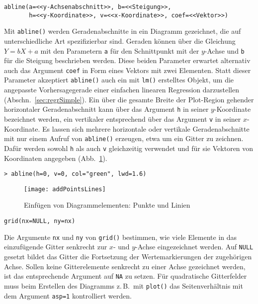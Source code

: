 \begin{lstlisting}
abline(a=<<y-Achsenabschnitt>>, b=<<Steigung>>,
       h=<<y-Koordinate>>, v=<<x-Koordinate>>, coef=<<Vektor>>)
\end{lstlisting}

Mit \lstinline!abline()! werden Geradenabschnitte in ein Diagramm gezeichnet, die auf unterschiedliche Art spezifizierbar sind. Geraden können über die Gleichung $Y = b X + a$ mit den Parametern \lstinline!a! für den Schnittpunkt mit der $y$-Achse und \lstinline!b! für die Steigung beschrieben werden. Diese beiden Parameter erwartet alternativ auch das Argument \lstinline!coef! in Form eines Vektors mit zwei Elementen. Statt dieser Parameter akzeptiert \lstinline!abline()! auch ein mit \lstinline!lm()! erstelltes Objekt, um die angepasste Vorhersagegerade einer einfachen linearen Regression darzustellen (Abschn.\ \ref{sec:regrSimple}). Ein über die gesamte Breite der Plot-Region gehender horizontaler Geradenabschnitt kann über das Argument \lstinline!h! in seiner $y$-Koordinate bezeichnet werden, ein vertikaler entsprechend über das Argument \lstinline!v! in seiner $x$-Koordinate. Es lassen sich mehrere horizontale oder vertikale Geradenabschnitte mit nur einem Aufruf von \lstinline!abline()! erzeugen, etwa um ein Gitter zu zeichnen. Dafür werden sowohl \lstinline!h! als auch \lstinline!v! gleichzeitig verwendet und für sie Vektoren von Koordinaten angegeben (Abb.\ \ref{fig:addPointsLines}).
\begin{lstlisting}
> abline(h=0, v=0, col="green", lwd=1.6)
\end{lstlisting}

\begin{figure}[ht]
\centering
\texttt{[image: addPointsLines]}
\vspace*{-1em}
\caption{Einfügen von Diagrammelementen: Punkte und Linien}
\label{fig:addPointsLines}
\end{figure}

\begin{lstlisting}
grid(nx=NULL, ny=nx)
\end{lstlisting}

Die Argumente \lstinline!nx! und \lstinline!ny! von \lstinline!grid()! bestimmen, wie viele Elemente in das einzufügende Gitter senkrecht zur $x$- und $y$-Achse eingezeichnet werden. Auf \lstinline!NULL! gesetzt bildet das Gitter die Fortsetzung der Wertemarkierungen der zugehörigen Achse. Sollen keine Gitterelemente senkrecht zu einer Achse gezeichnet werden, ist das entsprechende Argument auf \lstinline!NA! zu setzen. Für quadratische Gitterfelder muss beim Erstellen des Diagramms z.\,B.\ mit \lstinline!plot()! das Seitenverhältnis mit dem Argument \lstinline!asp=1! kontrolliert werden.

